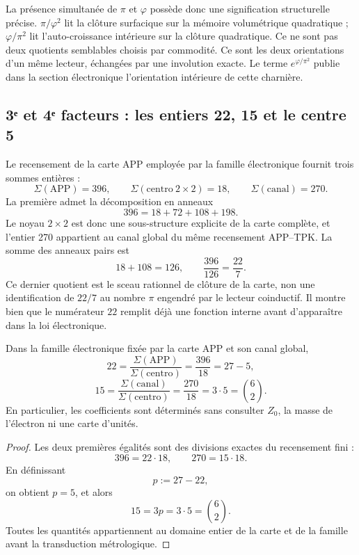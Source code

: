 La présence simultanée de \(\pi\) et \(\varphi\) possède donc une
signification structurelle précise. \(\pi/\varphi^2\) lit la clôture surfacique
sur la mémoire volumétrique quadratique ; \(\varphi/\pi^2\) lit
l'auto-croissance intérieure sur la clôture quadratique. Ce ne sont pas deux quotients
semblables choisis par commodité. Ce sont les deux orientations d'un même
lecteur, échangées par une involution exacte. Le terme
\(e^{\varphi/\pi^2}\) publie dans la section électronique l'orientation
intérieure de cette charnière.

\subsection{3ᵉ et 4ᵉ facteurs : les entiers 22, 15 et le centre 5}

Le recensement de la carte APP employée par la famille électronique fournit
trois sommes entières :
\[
 \Sigma(\mathrm{APP})=396,
 \qquad
 \Sigma(\mathrm{centro}\ 2\times2)=18,
 \qquad
 \Sigma(\mathrm{canal})=270.
\]
La première admet la décomposition en anneaux
\[
 396=18+72+108+198.
\]
Le noyau \(2\times2\) est donc une sous-structure explicite de la
carte complète, et l'entier 270 appartient au canal global du même recensement
APP--TPK.
La somme des anneaux pairs est
\[
 18+108=126,
 \qquad
 \frac{396}{126}=\frac{22}{7}.
\]
Ce dernier quotient est le sceau rationnel de clôture de la carte, non une
identification de \(22/7\) au nombre \(\pi\) engendré par le lecteur
coinductif. Il montre bien que le numérateur \(22\) remplit déjà une fonction
interne avant d'apparaître dans la loi électronique.

\begin{theorem}
\label{thm:coeficientes-electron-rev6}
Dans la famille électronique fixée par la carte APP et son canal global,
\[
 \boxed{
 22=\frac{\Sigma(\mathrm{APP})}
 {\Sigma(\mathrm{centro})}
 =\frac{396}{18}=27-5,}
\]
\[
 \boxed{
 15=\frac{\Sigma(\mathrm{canal})}
 {\Sigma(\mathrm{centro})}
 =\frac{270}{18}=3\cdot5=\binom62.}
\]
En particulier, les coefficients sont déterminés sans consulter
\(Z_0\), la masse de l'électron ni une carte d'unités.
\end{theorem}

\begin{proof}
Les deux premières égalités sont des divisions exactes du recensement fini :
\[
 396=22\cdot18,
 \qquad
 270=15\cdot18.
\]
En définissant
\[
 p:=27-22,
\]
on obtient \(p=5\), et alors
\[
 15=3p=3\cdot5=\binom62.
\]
Toutes les quantités appartiennent au domaine entier de la carte et de la
famille avant la transduction métrologique.
\end{proof}


